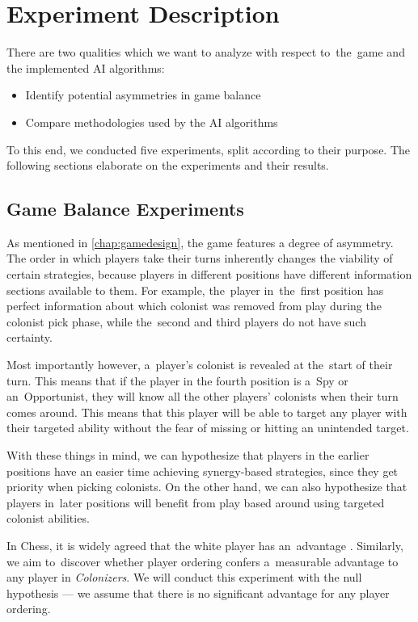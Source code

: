 \chapter{Experiment Description}

There are two qualities which we want to analyze with respect to~the~game
and the implemented AI algorithms:

\begin{itemize}
    \item Identify potential asymmetries in game balance
    \item Compare methodologies used by the AI algorithms
\end{itemize}

To this end, we conducted five experiments, split according to their purpose.
The following sections elaborate on the experiments and their results.

\section{Game Balance Experiments}

As mentioned in \autoref{chap:gamedesign}, the game features a degree of asymmetry.
The order in which players take their turns inherently changes the viability of certain
strategies, because players in different positions have different information sections
available to them. For example, the~player in~the~first position has perfect information
about which colonist was removed from play during the colonist pick phase, while
the~second and third players do not have such certainty.

Most importantly however, a~player's colonist is revealed at the~start of their
turn. This means that if the player in the fourth position is a~Spy or an~Opportunist,
they will know all the other players' colonists when their turn comes around.
This means that this player will be able to target any player with their targeted
ability without the fear of missing or hitting an unintended target.

With these things in mind, we can hypothesize that players in the earlier positions
have an easier time achieving synergy-based strategies, since they get priority
when picking colonists. On the other hand, we can also hypothesize that players in~later
positions will benefit from play based around using targeted colonist abilities.

In Chess, it is widely agreed that the white player has an~advantage \cite{Streeter46}. 
Similarly, we aim to~discover whether player ordering confers
a~measurable advantage to any player in \emph{Colonizers}.
We will conduct this experiment with the null hypothesis --- we assume
that there is no significant advantage for any player ordering.
\pagebreak

